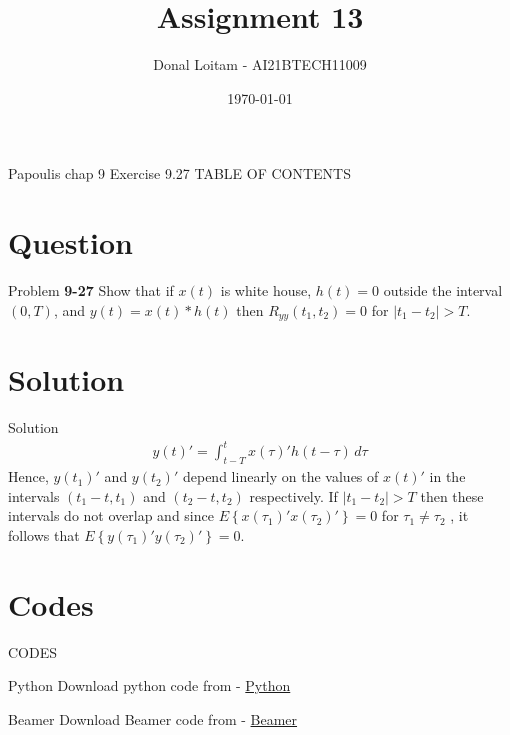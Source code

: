 \documentclass{beamer}
\title{Assignment 13}
\author{Donal Loitam - AI21BTECH11009}
\date{\today}
\providecommand{\cbrak}[1]{\ensuremath{\left\{#1\right\}}}
\begin{document}
\begin{frame}
    \titlepage 
\end{frame}

\logo{}


\begin{frame}{Papoulis chap 9 Exercise 9.27}
TABLE OF CONTENTS
    \tableofcontents
\end{frame}


\section{Question}
\begin{frame}{Problem}
\textbf{9-27}  Show that if $x(t)$ is white house, $h(t) = 0$ outside the interval $(0,T)$, and $y(t) = x(t) * h(t) $ then $R_{yy}(t_1,t_2) = 0$ for $\left|{t_1 - t_2}\right| > T.$ 
\end{frame}

\section{Solution}
\begin{frame}{Solution}
\begin{align}
y(t)' =  \int_{t-T}^{t} x(\tau)'h(t-\tau) \,d\tau
\end{align}
Hence, $y(t_1)'$ and $y(t_2)'$ depend linearly on the values of $x(t)'$ in the intervals $(t_1 - t, t_1)$ and $(t_2 - t, t_2)$ respectively. If $\left|{t_1 - t_2}\right| > T$ then these intervals do not overlap and since $E\cbrak{x(\tau_1)'x(\tau_2)'} = 0$ for $\tau_1 \not= \tau_2$ , it follows that $E\cbrak{y(\tau_1)'y(\tau_2)'} = 0$.

\end{frame}



\section{Codes}
\begin{frame}{CODES}
    \begin{block}{Python}
         Download python code from - \href{...}{Python}
    \end{block}

 \begin{block}{Beamer}
         Download Beamer code from - \href{https://github.com/Donal-08/Assignment12/blob/main/beamer_12.tex}{Beamer}
    \end{block}
\end{frame} 
\end{document}
